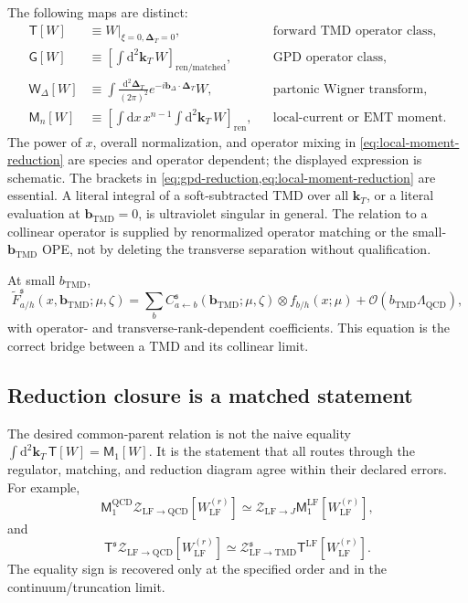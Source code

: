 \documentclass[11pt]{article}
\newcommand{\kT}{\bm{k}_{T}}
\newcommand{\DT}{\bm{\Delta}_{T}}
\newcommand{\bD}{\bm{b}_{\Delta}}
\newcommand{\bM}{\bm{b}_{\mathrm{TMD}}}
\newcommand{\dd}{\mathrm{d}}
\newcommand{\LF}{\mathrm{LF}}
\newcommand{\TMD}{\mathrm{TMD}}
\newcommand{\cO}{\mathcal O}
\newcommand{\cZ}{\mathcal Z}
\begin{document}
The following maps are distinct:
\begin{align}
 \mathsf T[W]
 &\equiv W\big|_{\xi=0,\DT=0},
 &&\text{forward TMD operator class},
\label{eq:tmd-reduction}\\
 \mathsf G[W]
 &\equiv \left[\int\dd^2\kT\,W\right]_{\mathrm{ren/matched}},
 &&\text{GPD operator class},
\label{eq:gpd-reduction}\\
 \mathsf W_{\Delta}[W]
 &\equiv\int\frac{\dd^2\DT}{(2\pi)^2}
 e^{-i\bD\cdot\DT}W,
 &&\text{partonic Wigner transform},
\label{eq:wigner-reduction}\\
 \mathsf M_n[W]
 &\equiv\left[\int\dd x\,x^{n-1}\int\dd^2\kT\,W\right]_{\mathrm{ren}},
 &&\text{local-current or EMT moment}.
\label{eq:local-moment-reduction}
\end{align}
The power of \(x\), overall normalization, and operator mixing in \cref{eq:local-moment-reduction} are species and operator dependent; the displayed expression is schematic.  The brackets in \cref{eq:gpd-reduction,eq:local-moment-reduction} are
essential.  A literal integral of a soft-subtracted TMD over all \(\kT\), or
a literal evaluation at \(\bM=0\), is ultraviolet singular in general.
The relation to a collinear operator is supplied by renormalized operator
matching or the small-\(\bM\) OPE, not by deleting the transverse separation
without qualification.

At small \(b_{\mathrm{TMD}}\),
\begin{equation}
 \widetilde F_{a/h}^{\mathfrak s}
 (x,\bM;\mu,\zeta)
 =\sum_b C_{a\leftarrow b}^{\mathfrak s}
 (\bM;\mu,\zeta)\otimes f_{b/h}(x;\mu)
 +\cO(b_{\mathrm{TMD}}\Lambda_{\mathrm{QCD}}),
\label{eq:small-b-ope}
\end{equation}
with operator- and transverse-rank-dependent coefficients.  This equation is
the correct bridge between a TMD and its collinear limit.

\subsection{Reduction closure is a matched statement}

The desired common-parent relation is not the naive equality
\(\int\dd^2\kT\,\mathsf T[W]=\mathsf M_1[W]\).  It is the statement that
all routes through the regulator, matching, and reduction diagram agree
within their declared errors.  For example,
\begin{equation}
 \mathsf M_1^{\mathrm{QCD}}
 \cZ_{\LF\to\mathrm{QCD}}[W_{\LF}^{(r)}]
 \simeq
 \cZ_{\LF\to J}
 \mathsf M_1^{\LF}[W_{\LF}^{(r)}],
\label{eq:current-closure-matched}
\end{equation}
and
\begin{equation}
 \mathsf T^{\mathfrak s}
 \cZ_{\LF\to\mathrm{QCD}}[W_{\LF}^{(r)}]
 \simeq
 \cZ_{\LF\to\TMD}^{\mathfrak s}
 \mathsf T^{\LF}[W_{\LF}^{(r)}].
\label{eq:tmd-closure-matched}
\end{equation}
The equality sign is recovered only at the specified order and in the
continuum/truncation limit.
\end{document}
